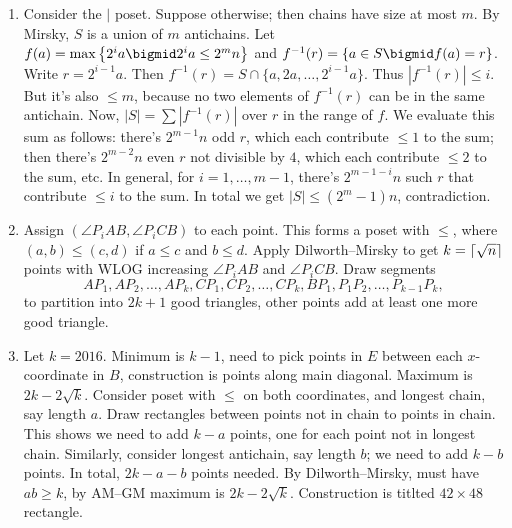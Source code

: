 \documentclass[11pt,paper=letter]{scrartcl}
\begin{document}
\begin{enumerate}
\item Consider the $\mid$ poset. Suppose otherwise; then chains have size at most $m$. By Mirsky, $S$ is a union of $m$ antichains. Let $f(a) = \max \left\{ 2^ia \bigmid 2^ia \le 2^mn \right\}$ and $f^{-1}(r) = \left\{ a \in S \bigmid f(a) = r \right\}$. Write $r = 2^{i-1}a$. Then $f^{-1}(r) = S \cap \{a, 2a, \ldots, 2^{i-1}a\}$. Thus $|f^{-1}(r)| \le i$. But it's also $\le m$, because no two elements of $f^{-1}(r)$ can be in the same antichain. Now, $|S| = \sum |f^{-1}(r)|$ over $r$ in the range of $f$. We evaluate this sum as follows: there's $2^{m-1}n$ odd $r$, which each contribute $\le 1$ to the sum; then there's $2^{m-2}n$ even $r$ not divisible by $4$, which each contribute $\le 2$ to the sum, etc. In general, for $i = 1, \ldots, m - 1$, there's $2^{m-1-i}n$ such $r$ that contribute $\le i$ to the sum. In total we get $|S| \le (2^m - 1)n$, contradiction.

\item Assign $(\angle P_iAB, \angle P_iCB)$ to each point. This forms a poset with $\le$, where $(a, b) \le (c, d)$ if $a \le c$ and $b \le d$. Apply Dilworth--Mirsky to get $k = \left\lceil \sqrt n \right\rceil$ points with WLOG increasing $\angle P_iAB$ and $\angle P_iCB$. Draw segments \[
  AP_1, AP_2, \ldots, AP_k, CP_1, CP_2, \ldots, CP_k, BP_1, P_1P_2, \ldots, P_{k-1}P_k,
\]
to partition into $2k + 1$ good triangles, other points add at least one more good triangle.

\item Let $k = 2016$. Minimum is $k - 1$, need to pick points in $E$ between each $x$-coordinate in $B$, construction is points along main diagonal. Maximum is $2k - 2\sqrt{k}$. Consider poset with $\le$ on both coordinates, and longest chain, say length $a$. Draw rectangles between points not in chain to points in chain. This shows we need to add $k - a$ points, one for each point not in longest chain. Similarly, consider longest antichain, say length $b$; we need to add $k - b$ points. In total, $2k - a - b$ points needed. By Dilworth--Mirsky, must have $ab \ge k$, by AM--GM maximum is $2k - 2\sqrt{k}$. Construction is titlted $42 \times 48$ rectangle.
\end{enumerate}
\end{document}
